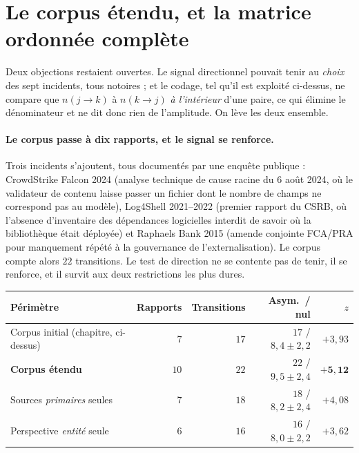 
\section{Le corpus étendu, et la matrice ordonnée complète}
\label{sec:corpus-etendu}

Deux objections restaient ouvertes. Le signal directionnel pouvait tenir au \emph{choix} des
sept incidents, tous notoires ; et le codage, tel qu'il est exploité ci-dessus, ne compare que
$n(j\to k)$ à $n(k\to j)$ \emph{à l'intérieur} d'une paire, ce qui élimine le dénominateur et
ne dit donc rien de l'amplitude. On lève les deux ensemble.

\paragraph{Le corpus passe à dix rapports, et le signal se renforce.} Trois incidents
s'ajoutent, tous documentés par une enquête publique : CrowdStrike Falcon 2024
(analyse technique de cause racine du 6 août 2024, où le validateur de contenu laisse passer un
fichier dont le nombre de champs ne correspond pas au modèle), Log4Shell 2021--2022
(premier rapport du CSRB, où l'absence d'inventaire des dépendances logicielles
interdit de savoir où la bibliothèque était déployée) et Raphaels Bank 2015 (amende
conjointe FCA/PRA pour manquement répété à la gouvernance de
l'externalisation). Le corpus compte alors $22$ transitions. Le test de direction ne se contente
pas de tenir, il se renforce, et il survit aux deux restrictions les plus dures.

\begin{center}\small
\renewcommand{\arraystretch}{1.25}
\begin{tabular}{@{}l r r r r@{}}
\toprule
\textbf{Périmètre} & \textbf{Rapports} & \textbf{Transitions} & \textbf{Asym.\ / nul} & $z$ \\
\midrule
Corpus initial (chapitre, ci-dessus) & $7$ & $17$ & $17$ / $8{,}4\pm2{,}2$ & $+3{,}93$ \\
\textbf{Corpus étendu} & $10$ & $22$ & $22$ / $9{,}5\pm2{,}4$ & $\mathbf{+5{,}12}$ \\
Sources \emph{primaires} seules & $7$ & $18$ & $18$ / $8{,}2\pm2{,}4$ & $+4{,}08$ \\
Perspective \emph{entité} seule & $6$ & $16$ & $16$ / $8{,}0\pm2{,}2$ & $+3{,}62$ \\
\bottomrule
\end{tabular}
\end{center}

